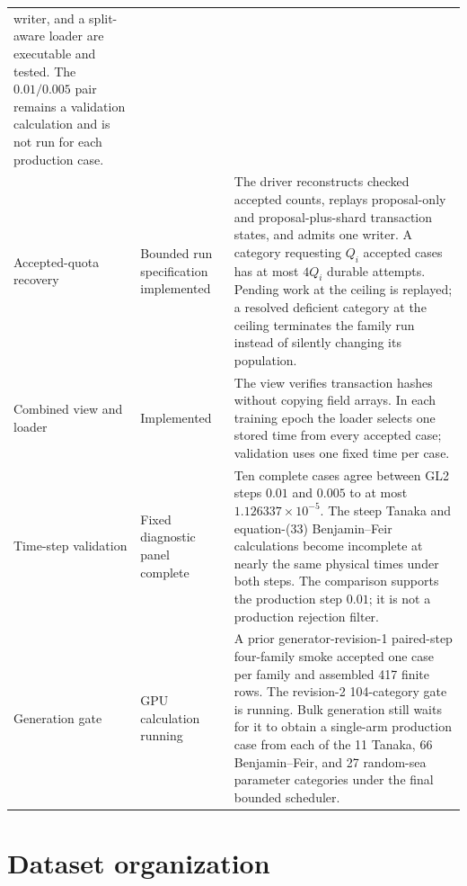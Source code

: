 \documentclass[11pt]{article}
\begin{document}
\begin{center}
\begin{tabularx}{\textwidth}{
  @{}>{\raggedright\arraybackslash}p{}
     >{\raggedright\arraybackslash}p{}
     >{\raggedright\arraybackslash}X@{}}
      writer, and a split-aware loader are executable and tested.  The
      $0.01/0.005$ pair remains a validation calculation and is not run for
      each production case. \\
  Accepted-quota recovery
    & Bounded run specification implemented
    & The driver reconstructs checked accepted counts, replays proposal-only
      and proposal-plus-shard transaction states, and admits one writer.  A
      category requesting $Q_i$ accepted cases has at most $4Q_i$ durable
      attempts.  Pending work at the ceiling is replayed; a resolved
      deficient category at the ceiling terminates the family run instead of
      silently changing its population. \\
  Combined view and loader
    & Implemented
    & The view verifies transaction hashes without copying field arrays.
      In each training epoch the loader selects one stored time from every
      accepted case; validation uses one fixed time per case. \\
  Time-step validation
    & Fixed diagnostic panel complete
    & Ten complete cases agree between GL2 steps $0.01$ and $0.005$ to at
      most $1.126337\times10^{-5}$.  The steep Tanaka and equation-(33)
      Benjamin--Feir calculations become incomplete at nearly the same
      physical times under both steps.  The comparison supports the
      production step $0.01$; it is not a production rejection filter. \\
  Generation gate
    & GPU calculation running
    & A prior generator-revision-1 paired-step four-family smoke accepted one
      case per family and assembled 417 finite rows.  The revision-2
      104-category gate is running.  Bulk generation still waits for it to
      obtain a single-arm production case from each of the 11 Tanaka, 66
      Benjamin--Feir, and 27 random-sea parameter categories under the final
      bounded scheduler. \\
  \bottomrule
\end{tabularx}
\end{center}

\section{Dataset organization}
\label{sec:dataset-design}
\end{document}
